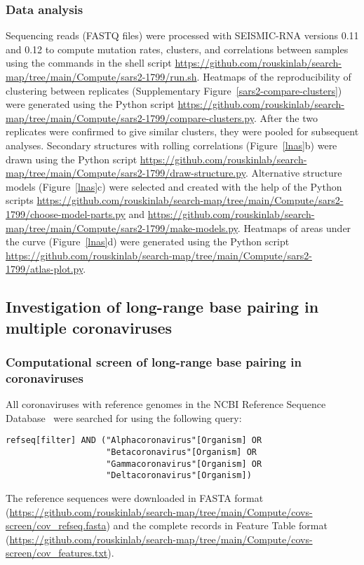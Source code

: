 \documentclass[main.tex]{subfiles}
\begin{document}
\subsubsection{Data analysis}

Sequencing reads (FASTQ files) were processed with SEISMIC-RNA versions 0.11 and 0.12 to compute mutation rates, clusters, and correlations between samples using the commands in the shell script \url{https://github.com/rouskinlab/search-map/tree/main/Compute/sars2-1799/run.sh}.
Heatmaps of the reproducibility of clustering between replicates (Supplementary Figure~\ref{sars2-compare-clusters}) were generated using the Python script \url{https://github.com/rouskinlab/search-map/tree/main/Compute/sars2-1799/compare-clusters.py}.
After the two replicates were confirmed to give similar clusters, they were pooled for subsequent analyses.
Secondary structures with rolling correlations (Figure~\ref{lnas}b) were drawn using the Python script \url{https://github.com/rouskinlab/search-map/tree/main/Compute/sars2-1799/draw-structure.py}.
Alternative structure models (Figure~\ref{lnas}c) were selected and created with the help of the Python scripts \url{https://github.com/rouskinlab/search-map/tree/main/Compute/sars2-1799/choose-model-parts.py} and \url{https://github.com/rouskinlab/search-map/tree/main/Compute/sars2-1799/make-models.py}.
Heatmaps of areas under the curve (Figure~\ref{lnas}d) were generated using the Python script \url{https://github.com/rouskinlab/search-map/tree/main/Compute/sars2-1799/atlas-plot.py}.


\subsection{Investigation of long-range base pairing in multiple coronaviruses}

\subsubsection{Computational screen of long-range base pairing in coronaviruses}
\label{screen_lri_comp}

All coronaviruses with reference genomes in the NCBI Reference Sequence Database~\cite{OLeary2016} were searched for using the following query:
\begin{verbatim}
refseq[filter] AND ("Alphacoronavirus"[Organism] OR
                    "Betacoronavirus"[Organism] OR
                    "Gammacoronavirus"[Organism] OR
                    "Deltacoronavirus"[Organism])
\end{verbatim}
The reference sequences were downloaded in FASTA format (\url{https://github.com/rouskinlab/search-map/tree/main/Compute/covs-screen/cov_refseq.fasta}) and the complete records in Feature Table format (\url{https://github.com/rouskinlab/search-map/tree/main/Compute/covs-screen/cov_features.txt}).
\end{document}
